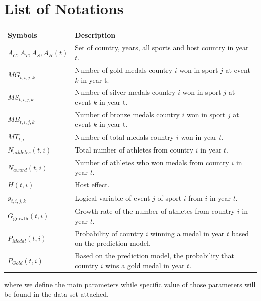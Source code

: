 \documentclass{mcmthesis}
\begin{document}
\section{List of Notations}
\begin{center}
\begin{tabular}{ll}
	\toprule
	{\bf Symbols} & {\bf Description}  \\
	\midrule 
	$A_{C},A_{T},A_{S},A_{H}(t)$ & Set of country, years, all sports and host country in year $t$.\\
	$MG_{t,i,j,k}$ & Number of gold medals country $i$ won in sport $j$ at event $k$ in year t. \\
	$MS_{t,i,j,k}$ & Number of silver medals country $i$ won in sport $j$ at event $k$ in year t. \\
	$MB_{t,i,j,k}$ & Number of bronze medals country $i$ won in sport $j$ at event $k$ in year t. \\
	$MT_{t,i}$ & Number of total medals country $i$ won in year $t$. \\
	$N_{athletes}(t,i)$ & Total number of athletes from country $i$ in year $t$. \\
	$N_{award}(t,i)$ & Number of athletes who won medals from country $i$ in year $t$. \\
	$H(t,i)$ & Host effect. \\
	$y_{t,i,j,k}$ &  Logical variable of event $j$ of sport $i$ from $i$ in year $t$. \\
	$G_{\text{growth}}(t,i)$ & Growth rate of the number of athletes from country $i$ in year $t$.\\
	$P_{Medal}(t,i)$ & Probability of country $i$ winning a medal in year $t$ based on the prediction model.\\
	$P_{Gold}(t,i)$ & Based on the prediction model, the probability that country $i$ wins a gold medal in year $t$.\\
	\bottomrule
\end{tabular}
\end{center}

\noindent where we define the main parameters while specific value of those 
parameters will be found in the data-set attached.











\end{document}
